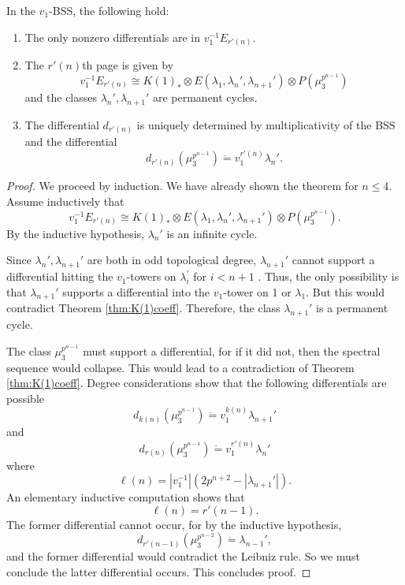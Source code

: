 \begin{thm}\label{key to proof 2}
	In the $v_1$-BSS, the following hold: 
	\begin{enumerate}
		\item The only nonzero differentials are in $v_1^{-1}E_{r'(n)}$. 
		\item The $r'(n)$th page is given by 
		\[
		v_1^{-1}E_{r'(n)} \cong K(1)_*\otimes E(\lambda_1, \lambda_n', \lambda_{n+1}')\otimes P(\mu_3^{p^{n-1}})
		\]
		and the classes $\lambda_{n}', \lambda_{n+1}'$ are permanent cycles. 
		\item The differential $d_{r'(n)}$ is uniquely determined by multiplicativity of the BSS and the differential
		\[
		d_{r'(n)}(\mu_3^{p^{n-1}})\dot{=}v_1^{r'(n)}\lambda_n'.
		\]
	\end{enumerate}
\end{thm}
\begin{proof}
	We proceed by induction. We have already shown the theorem for $n\leq 4$. Assume inductively that 
	\[
	v_1^{-1}E_{r'(n)}\cong K(1)_*\otimes E(\lambda_1, \lambda_n', \lambda_{n+1}')\otimes P(\mu_3^{p^{n-1}}).
	\]
	By the inductive hypothesis, $\lambda_n'$ is an infinite cycle.  
	
	Since $\lambda_n', \lambda_{n+1}'$ are both in odd topological degree, $\lambda_{n+1}'$ cannot support a differential hitting the $v_1$-towers on $\lambda_i^{\prime}$ for $i<n+1$ . Thus, the only possibility is that $\lambda_{n+1}'$ supports a differential into the $v_1$-tower on 1 or $\lambda_1$. But this would contradict Theorem \ref{thm:K(1)coeff}. Therefore, the class $\lambda_{n+1}'$ is a permanent cycle. 
	
	The class $\mu_3^{p^{n-1}}$ must support a differential, for if it did not, then the spectral sequence would collapse. This would lead to a contradiction of Theorem \ref{thm:K(1)coeff}. Degree considerations show that the following differentials are possible
	\[
	d_{k(n)}(\mu_3^{p^{n-1}})\dot{=}v_1^{k(n)}\lambda_{n+1}'
	\]
	and 
	\[
	d_{r(n)}(\mu_3^{p^{n-1}})\dot{=}v_1^{r'(n)}\lambda_{n}'
	\]
	where
	\[
	\ell(n) = |v_1^{-1}|(2p^{n+2}-|\lambda_{n+1}'|).
	\]
	An elementary inductive computation shows that 
	\[
	\ell(n) = r'(n-1).
	\]
	The former differential cannot occur, for by the inductive hypothesis, 
	\[
	d_{r'(n-1)} (\mu_3^{p^{n-2}})\dot{=}\lambda_{n-1}', 
	\]
	and the former differential would contradict the Leibniz rule. So we must conclude the latter differential occurs. This concludes proof.
\end{proof}

